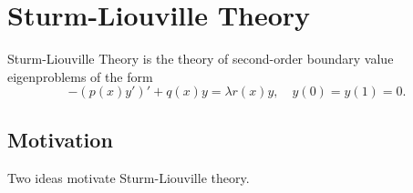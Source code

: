 \section{Sturm-Liouville Theory}\label{sec:slmain}

Sturm-Liouville Theory is the theory of second-order boundary value eigenproblems of the form
\begin{equation}
	-\left(p(x)y'\right)' + q(x)y = \lambda r(x)y, \quad y(0)=y(1)=0.
\end{equation}

\subsection{Motivation}

Two ideas motivate Sturm-Liouville theory.

